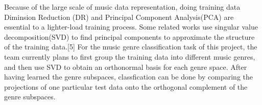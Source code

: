 \begin{par}
    \par \hspace{15pt} Because of the large scale of music data representation, doing training data Diminsion Reduction (DR) and Principal Component Analysis(PCA) are essential to a lighter-load training process. Some related works use singular value decomposition(SVD) to find principal components to approximate the structure of the training data.[5] For the music genre classification task of this project, the team currently plans to first group the training data into different music genres, and then use SVD to obtain an orthonormal basis for each genre space. After having learned the genre subspaces, classfication can be done by comparing the projections of one particular test data onto the orthogonal complement of the genre subspaces.
\end{par}